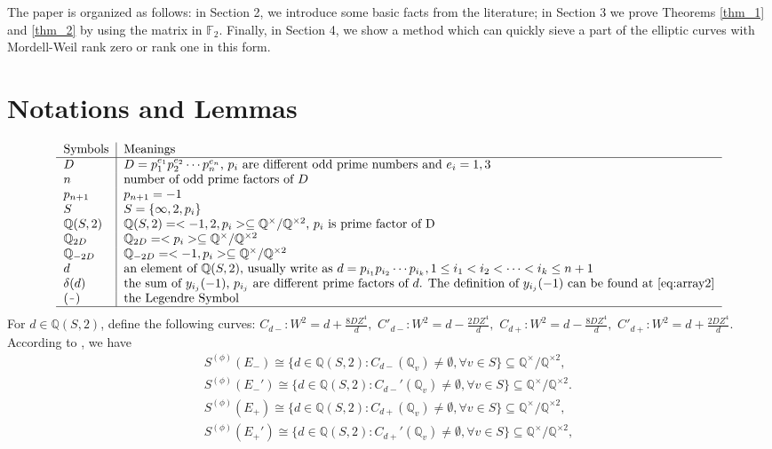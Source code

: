 \documentclass{amsart}
\numberwithin{equation}{section}
\theoremstyle{plain}
\theoremstyle{definition}
\newcommand{\FF}{\mathbb F}
\newcommand{\QQ}{\mathbb Q}
\begin{document}
The paper is organized as follows: in Section 2, we introduce some basic facts from the literature; in Section 3 we prove Theorems \ref{thm_1} and \ref{thm_2} by using the matrix in $\FF_2$. Finally, in Section 4, we show a method
which can quickly sieve a part of the elliptic curves with Mordell-Weil rank zero or rank one in this form.
\section{Notations and Lemmas}\label{sec_2}

\[
\begin{tabular}{l|l}
\text{Symbols} & \text{Meanings} \\ \hline
$D$  &  $D = p_1^{e_1}p_2^{e_2}\cdots p_n^{e_n}$, $p_i$ are different odd prime numbers and $e_i = 1,3$\\
$n$  &  number of odd prime factors of $D$\\
$p_{n+1}$ & $p_{n+1} = -1$ \\
$S$ & $S = \{ \infty, 2, p_i \}$ \\
$\mathbb{Q}(S,2)$ & $\mathbb{Q}(S,2) = <-1,2,p_i>\subseteq \mathbb{Q}^{\times}/\QQ^{\times2} $, $p_i$ is prime factor of D  \\
$\QQ_{2D}$ & $\QQ_{2D} = <p_i> \subseteq \QQ^{\times}/\QQ^{\times2} $\\
$\QQ_{-2D}$ & $\QQ_{-2D} = <-1, p_i> \subseteq \QQ^{\times}/\QQ^{\times2}$\\
$d$ & an element of $\mathbb{Q}(S,2)$, usually write as $d = p_{i_1}p_{i_2}\cdots p_{i_k} , 1 \le i_1 < i_2 < \cdots < i_k \le n+1$ \\

$\delta (d)$ & the sum of $y_{i_j}(-1)$, $p_{i_j}$ are different prime factors of $d$. The definition of $y_{i_j}(-1)$ can be found at \ref{eq:array2}\\
$(\frac{\ }{\ })$ & the Legendre  Symbol\\
\hline
\end{tabular}
\]
For $d\in \QQ(S,2)$, define the following curves: $ C_{d-}: W^2 = d + \frac{8DZ^4}{d},$ $ C'_{d-}: W^2 = d - \frac{2DZ^4}{d},$ $ C_{d+}: W^2 = d - \frac{8DZ^4}{d},$ $ C'_{d+}: W^2 = d + \frac{2DZ^4}{d}. $
According to \cite{gtm106}, we have
$$
\begin{aligned}
 S^{(\phi)}(E_-) \cong \{d \in \mathbb{Q}(S,2): C_{d-}(\mathbb{Q}_v) \neq \emptyset , \forall v \in S \} \subseteq \QQ^{\times}/\QQ^{\times2 }, \\
S^{({\phi})}(E_-') \cong \{d \in \mathbb{Q}(S,2): C_{d-}'(\mathbb{Q}_v) \neq \emptyset , \forall v \in S \}\subseteq \QQ^{\times}/\QQ^{\times2 }. \\
S^{(\phi)}(E_+) \cong \{d \in \mathbb{Q}(S,2): C_{d+}(\mathbb{Q}_v) \neq \emptyset , \forall v \in S \} \subseteq \QQ^{\times}/\QQ^{\times2 },\\
S^{({\phi})}(E_+') \cong \{d \in \mathbb{Q}(S,2): C_{d+}'(\mathbb{Q}_v) \neq \emptyset , \forall v \in S \}\subseteq \QQ^{\times}/\QQ^{\times2 }, \\
\end{aligned}
$$
\end{document}
